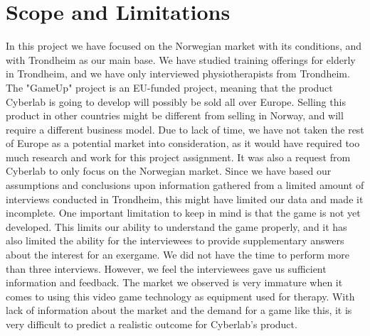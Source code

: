 \section{Scope and Limitations}
In this project we have focused on the Norwegian market with its conditions, and with Trondheim as our main base. We have studied training offerings for elderly in Trondheim, and we have only interviewed physiotherapists from Trondheim. The "GameUp" project is an EU-funded project, meaning that the product Cyberlab is going to develop will possibly be sold all over Europe. Selling this product in other countries might be different from selling in Norway, and will require a different business model. Due to lack of time, we have not taken the rest of Europe as a potential market into consideration, as it would have required too much research and work for this project assignment. It was also a request from Cyberlab to only focus on the Norwegian market. Since we have based our assumptions and conclusions upon information gathered from a limited amount of interviews conducted in Trondheim, this might have limited our data and made it incomplete. One important limitation to keep in mind is that the game is not yet developed. This limits our ability to understand the game properly, and it has also limited the ability for the interviewees to provide supplementary answers about the interest for an exergame. We did not have the time to perform more than three interviews. However, we feel the interviewees gave us sufficient information and feedback. The market we observed is very immature when it comes to using this video game technology as equipment used for therapy. With lack of information about the market and the demand for a game like this, it is very difficult to predict a realistic outcome for Cyberlab’s product.

